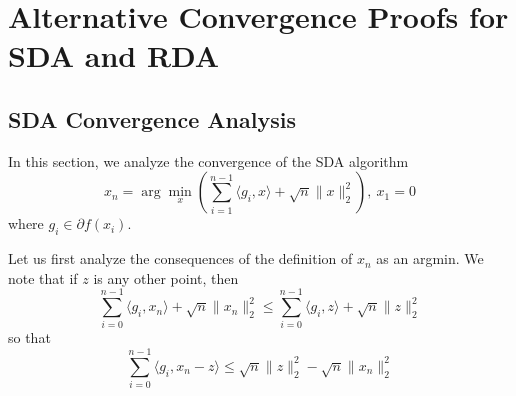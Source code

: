 \iffalse
\section{Alternative Convergence Proofs for SDA and RDA}
\subsection{SDA Convergence Analysis}
In this section, we analyze the convergence of the SDA algorithm
\begin{equation}\label{SDE_iteration}
    x_n = \arg\min_x \left(\displaystyle\sum_{i = 1}^{n-1} \langle g_i, x\rangle + \sqrt{n}\|x\|_2^2\right),~x_1 = 0
\end{equation}
where $g_i\in \partial f(x_i)$.

Let us first analyze the consequences of the definition of $x_n$ as an argmin. We note that if
$z$ is any other point, then
\begin{equation}
    \displaystyle\sum_{i = 0}^{n-1} \langle g_i, x_n\rangle + \sqrt{n}\|x_n\|_2^2 \leq \displaystyle\sum_{i = 0}^{n-1} \langle g_i, z\rangle + \sqrt{n}\|z\|_2^2
\end{equation}
so that
\begin{equation}\label{minimum_property}
    \displaystyle\sum_{i = 0}^{n-1} \langle g_i, x_n - z\rangle \leq \sqrt{n}\|z\|_2^2 - \sqrt{n}\|x_n\|_2^2
\end{equation}

